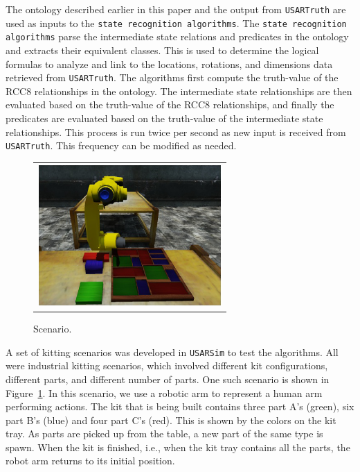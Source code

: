 \documentclass[final,1p,times]{elsarticle}
\begin{document}
The ontology described earlier in this paper and the output from \texttt{USARTruth} are used as inputs to the \texttt{state recognition algorithms}. The \texttt{state recognition algorithms} parse the intermediate state relations and predicates in the ontology and extracts their equivalent classes. This is used to determine the logical formulas to analyze and link to the locations, rotations, and dimensions data retrieved from \texttt{USARTruth}. The algorithms first compute the truth-value of the RCC8 relationships in the ontology. The intermediate state relationships are then evaluated based on the truth-value of the RCC8 relationships, and finally the predicates are evaluated based on the truth-value of the intermediate state relationships. This process is run twice per second as new input is received from \texttt{USARTruth}. This frequency can be modified as needed.

\begin{figure}[t!h!]
\begin{center}
\begin{tabular}{c}
\includegraphics[width=7cm]{simulation.eps}
\end{tabular}
\end{center}
\caption{Scenario.}
\label{fig:scenario}
\end{figure}

A set of kitting scenarios was developed in \texttt{USARSim} to test the algorithms. All were industrial kitting scenarios, which involved different kit configurations, different parts, and different number of parts. One such scenario is shown in Figure~\ref{fig:scenario}. In this scenario, we use a robotic arm to represent a human arm performing actions. The kit that is being built contains three part A's (green), six part B's (blue) and four part C's (red). This is shown by the colors on the kit tray. As parts are picked up from the table, a new part of the same type is spawn. When the kit is finished, i.e., when the kit tray contains all the parts, the robot arm returns to its initial position.
\end{document}
